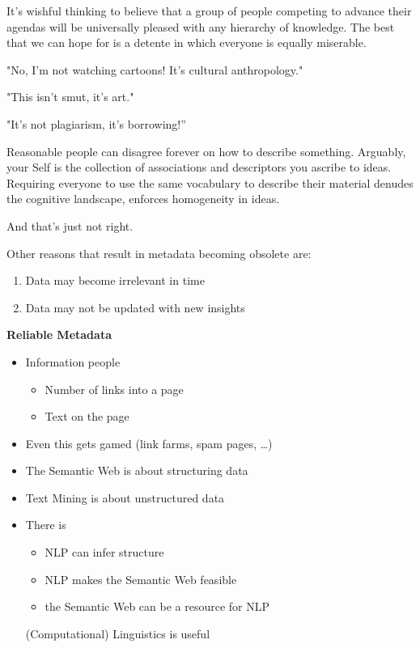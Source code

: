\documentclass[a4paper,landscape,headrule,footrule,xetex]{foils}
\begin{document}
It's wishful thinking to believe that a group of people competing to
advance their agendas will be universally pleased with any hierarchy
of knowledge. The best that we can hope for is a detente in which
everyone is equally miserable.


"No, I'm not watching cartoons! It's cultural anthropology."

"This isn't smut, it's art."

"It's not plagiarism, it's borrowing!''

Reasonable people can disagree forever on how to describe something. Arguably, your Self is the collection of associations and descriptors you ascribe to ideas. Requiring everyone to use the same vocabulary to describe their material denudes the cognitive landscape, enforces homogeneity in ideas.

And that's just not right. 


\MyLogo{}
Other reasons that result in metadata becoming obsolete are:

\begin{enumerate}
\item Data may become irrelevant in time
\item Data may not be updated with new insights
\end{enumerate}

\textbf{Reliable Metadata}

\begin{itemize}
\item Information people 
  \begin{itemize}
  \item Number of links into a page
  \item Text on the page
  \end{itemize}
\item Even this gets gamed (link farms, spam pages, \ldots)
\end{itemize}


\begin{itemize}
\item The Semantic Web is about structuring data
\item Text Mining is about unstructured data
\item There is 
  \begin{itemize}
  \item NLP can infer structure
  \item NLP makes the Semantic Web feasible
  \item the Semantic Web can be a resource for NLP
  \end{itemize}
   (Computational) Linguistics is useful

\end{itemize}
\end{document}
